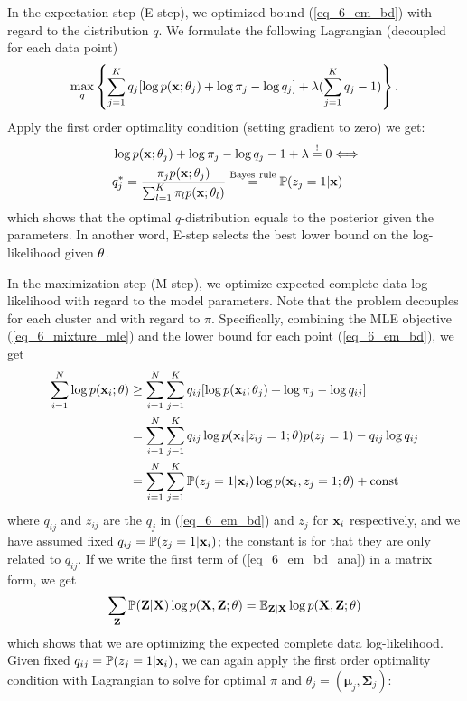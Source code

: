 \documentclass[../book-template.tex]{subfiles}
\begin{document}
\par In the expectation step (E-step), we optimized bound (\ref{eq_6_em_bd}) with regard to the distribution $q$. We formulate the following Lagrangian (decoupled for each data point)
\begin{equation*}
	\max_{q}\left\{\sum_{j=1}^{K}q_j[\log p({\bf x};\theta_j) +\log \pi_j - \log q_j] +\lambda (\sum_{j=1}^{K}q_j -1) \right\}.
\end{equation*}
Apply the first order optimality condition (setting gradient to zero) we get:
\begin{align*}
	&\log p({\bf x};\theta_j) +\log \pi_j - \log q_j - 1 +\lambda \overset{!}{=}0 \Longleftrightarrow\\
	&q_j^*=\frac{\pi_jp({\bf x};\theta_j)}{\sum_{l=1}^{K}\pi_lp({\bf x};\theta_l)}\overset{\rm Bayes\ rule}{=}\mathbb{P}(z_j=1|{\bf x})
\end{align*} 
which shows that the optimal $q$-distribution equals to the posterior given the parameters. In another word, E-step selects the best lower bound on the log-likelihood given ${\bf \theta}$.
\par In the maximization step (M-step), we optimize expected complete data log-likelihood with regard to the model parameters. Note that the problem decouples for each cluster and with regard to $\pi$. Specifically, combining the MLE objective (\ref{eq_6_mixture_mle}) and the lower bound for each point (\ref{eq_6_em_bd}), we get
\begin{align}
	\label{eq_6_em_bd_cplt}\sum_{i=1}^{N}\log p({\bf x}_i;\theta) &\geq \sum_{i=1}^{N}\sum_{j=1}^{K}q_{ij}[\log p({\bf x}_i;\theta_j) +\log \pi_j - \log q_{ij}]\\
	&=\sum_{i=1}^{N}\sum_{j=1}^{K}q_{ij}\log p({\bf x}_i|z_{ij}=1;\theta)p(z_j=1) -q_{ij}\log q_{ij}\notag\\
	\label{eq_6_em_bd_ana}&=\sum_{i=1}^{N}\sum_{j=1}^{K}\mathbb{P}(z_j=1|{\bf x}_i)\log p({\bf x}_i,z_j=1;\theta) +{\rm const}
\end{align}
where $q_{ij}$ and $z_{ij}$ are the $q_j$ in (\ref{eq_6_em_bd}) and $z_j$ for ${\bf x}_i$ respectively, and we have assumed fixed $q_{ij} = \mathbb{P}(z_j=1|{\bf x}_i)$; the constant is for that they are only related to $q_{ij}$. If we write the first term of (\ref{eq_6_em_bd_ana}) in a matrix form, we get
\begin{equation*}
	\sum_{\bf Z}\mathbb{P}({\bf Z}|{\bf X})\log p({\bf X,Z};\theta)=\mathbb{E}_{\bf Z|X}\log p({\bf X,Z};\theta)
\end{equation*}
which shows that we are optimizing the expected complete data log-likelihood. Given fixed $q_{ij} = \mathbb{P}(z_j=1|{\bf x}_i)$, we can again apply the first order optimality condition with Lagrangian to solve for optimal $\pi$ and $ \theta_j = (\bm{\mu}_j,\bm{\Sigma}_j)$:
\end{document}
